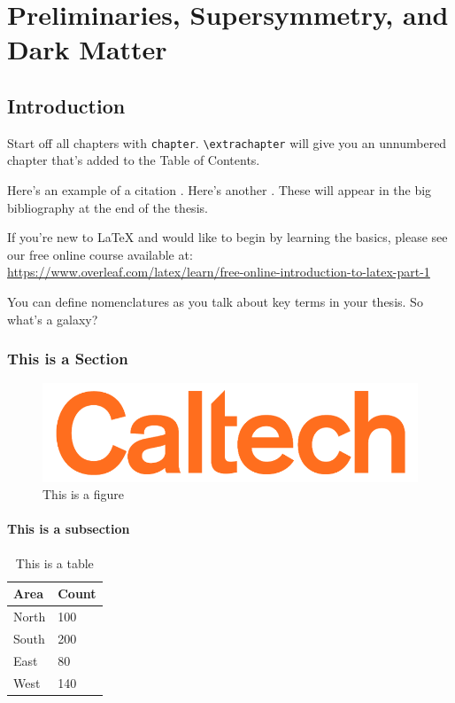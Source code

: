 \documentclass[14pt]{caltech_thesis}
\begin{document}
\tableofcontents
\listoffigures
\listoftables
\printnomenclature

\mainmatter
\part{Preliminaries, Supersymmetry, and Dark Matter}
\chapter{Introduction}
Start off all chapters with \verb|chapter|.  \verb|\extrachapter| will give you an unnumbered chapter that's added to the Table of Contents. 

Here's an example of a citation \citep{GMP81}. Here's another \citep{PP98}. These will appear in the big bibliography at the end of the thesis.

If you're new to \LaTeX{} and would like to begin by learning the basics, please see our free online course available at:\\ \url{https://www.overleaf.com/latex/learn/free-online-introduction-to-latex-part-1} 

You can define nomenclatures  as you talk about
key terms in your thesis. So what's a galaxy? 

\section{This is a Section}
\lipsum[1-2]

\begin{figure}[hbt!]
\centering
\includegraphics[width=.3\textwidth]{caltech.png}
\caption{This is a figure}\label{fig:logo}
\end{figure}

\subsection{This is a subsection}

\begin{table}[hbt!]
\centering
\begin{tabular}{ll}
\hline
Area & Count\\
\hline
North & 100\\
South & 200\\
East & 80\\
West & 140\\
\hline
\end{tabular}
\caption{This is a table}\label{tab:sample}
\end{table}
\end{document}
